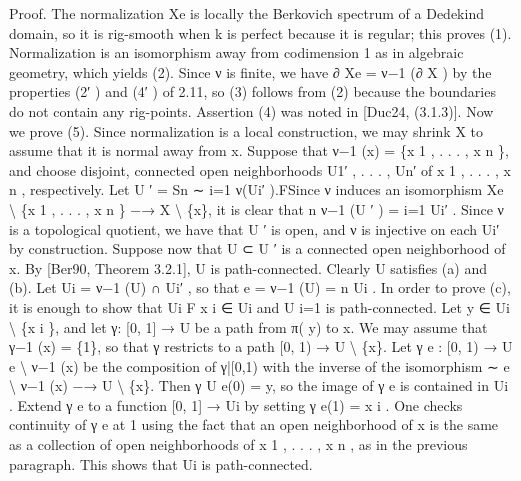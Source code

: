 \documentclass[
  10pt,
]{article}
\newenvironment{Shaded}{}{}
\newcommand{\NormalTok}[1]{#1}
\begin{document}
\begin{Shaded}
\begin{Highlighting}[]
\NormalTok{Proof. The normalization Xe is locally the Berkovich spectrum of a Dedekind domain, so it}
\NormalTok{is rig{-}smooth when k is perfect because it is regular; this proves (1). Normalization is an}
\NormalTok{isomorphism away from codimension 1 as in algebraic geometry, which yields (2). Since}
\NormalTok{ν is finite, we have ∂ Xe = ν−1 (∂ X ) by the properties (2′ ) and (4′ ) of 2.11, so (3) follows}
\NormalTok{from (2) because the boundaries do not contain any rig{-}points. Assertion (4) was noted}
\NormalTok{in [Duc24, (3.1.3)].}
\NormalTok{    Now we prove (5). Since normalization is a local construction, we may shrink X to}
\NormalTok{assume that it is normal away from x. Suppose that ν−1 (x) = \{x 1 , . . . , x n \}, and choose}
\NormalTok{disjoint, connected open neighborhoods U1′ , . . . , Un′ of x 1 , . . . , x n , respectively. Let U ′ =}
\NormalTok{Sn                                                                         ∼}
\NormalTok{   i=1}
\NormalTok{       ν(Ui′ ).FSince ν induces an isomorphism Xe \textbackslash{} \{x 1 , . . . , x n \} −→ X \textbackslash{} \{x\}, it is clear that}
\NormalTok{                      n}
\NormalTok{ν−1 (U ′ ) = i=1 Ui′ . Since ν is a topological quotient, we have that U ′ is open, and ν is}
\NormalTok{injective on each Ui′ by construction.}
\NormalTok{    Suppose now that U ⊂ U ′ is a connected open neighborhood of x. By [Ber90, Theorem}
\NormalTok{3.2.1], U is path{-}connected. Clearly U satisfies (a) and (b). Let Ui = ν−1 (U) ∩ Ui′ , so that}
\NormalTok{                      e = ν−1 (U) = n Ui . In order to prove (c), it is enough to show that Ui}
\NormalTok{                                      F}
\NormalTok{x i ∈ Ui and U                          i=1}
\NormalTok{is path{-}connected. Let y ∈ Ui \textbackslash{} \{x i \}, and let γ: [0, 1] → U be a path from π( y) to x.}
\NormalTok{We may assume that γ−1 (x) = \{1\}, so that γ restricts to a path [0, 1) → U \textbackslash{} \{x\}. Let}
\NormalTok{γ}
\NormalTok{e : [0, 1) → U       e \textbackslash{} ν−1 (x) be the composition of γ|[0,1) with the inverse of the isomorphism}
\NormalTok{                      ∼}
\NormalTok{e \textbackslash{} ν−1 (x) −→ U \textbackslash{} \{x\}. Then γ}
\NormalTok{U                                        e(0) = y, so the image of γ e is contained in Ui . Extend γ  e}
\NormalTok{to a function [0, 1] → Ui by setting γ        e(1) = x i . One checks continuity of γ e at 1 using the}
\NormalTok{fact that an open neighborhood of x is the same as a collection of open neighborhoods}
\NormalTok{of x 1 , . . . , x n , as in the previous paragraph. This shows that Ui is path{-}connected.}

\end{Highlighting}
\end{Shaded}
\end{document}

